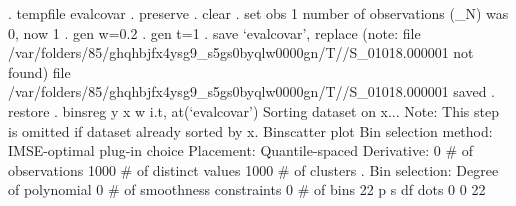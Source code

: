 . tempfile evalcovar
{\smallskip}
. preserve
{\smallskip}
. clear
{\smallskip}
. set obs 1
number of observations (_N) was 0, now 1
{\smallskip}
. gen w=0.2
{\smallskip}
. gen t=1
{\smallskip}
. save `evalcovar', replace
(note: file /var/folders/85/ghqhbjfx4ysg9_s5gs0byqlw0000gn/T//S_01018.000001 not found)
file /var/folders/85/ghqhbjfx4ysg9_s5gs0byqlw0000gn/T//S_01018.000001 saved
{\smallskip}
. restore
{\smallskip}
. binsreg y x w i.t, at(`evalcovar')
Sorting dataset on x...
Note: This step is omitted if dataset already sorted by x.
{\smallskip}
Binscatter plot
Bin selection method: IMSE-optimal plug-in choice
Placement: Quantile-spaced
Derivative: 0
{\smallskip}
\# of observations             {\VBAR}    1000
\# of distinct values          {\VBAR}    1000
\# of clusters                 {\VBAR}       .
Bin selection:                {\VBAR} 
         Degree of polynomial {\VBAR}       0
  \# of smoothness constraints {\VBAR}       0
                    \# of bins {\VBAR}      22
{\smallskip}
         {\VBAR}      p       s       df
 dots    {\VBAR}      0       0       22
